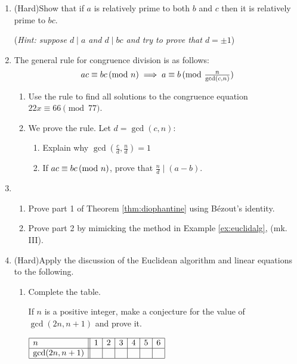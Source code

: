 \begin{exercises}{}{}
\begin{enumerate}
	    
	    \item (Hard)\lstsp Show that if $a$ is relatively prime to both $b$ and $c$ then it is relatively prime to $bc$.\par
	    (\emph{Hint: suppose $d\mid a$ and $d\mid bc$ and try to prove that $d=\pm 1$})
	    
	    
			\item\label{exs:congdivision} The general rule for congruence division is as follows:
			\[
				ac\equiv bc\negthickspace\pmod{n} \implies a\equiv b\negthickspace\pmod{\tfrac n{\gcd(c,n)}}
			\]
			\begin{enumerate}
			  \item Use the rule to find all solutions to the congruence equation $22x\equiv 66\pmod{77}$.
			  \item We prove the rule. Let $d=\gcd(c,n)$:
			  \begin{enumerate}
			    \item Explain why $\gcd(\frac cd,\frac nd)=1$
			  	\item If $ac\equiv bc\negthickspace\pmod{n}$, prove that $\frac nd\mid(a-b)$.
				\end{enumerate}
			\end{enumerate}
			
	    
	  \item\begin{enumerate}
	    \item Prove part 1 of Theorem \ref{thm:diophantine} using Bézout's identity.
	    \item Prove part 2 by mimicking the method in Example \ref{ex:euclidalg}, (mk.\,III).
	  \end{enumerate} 
	    
	    
	  \item (Hard)\lstsp Apply the discussion of the Euclidean algorithm and linear equations to the following.
	  
	  \begin{enumerate}
	    \item Complete the table.\par
	    \begin{minipage}[t]{0.55\linewidth}\vspace{-8pt}
	  	If $n$ is a positive integer, make a conjecture for the value of $\gcd(2n,n+1)$ and prove it.
	    \end{minipage}
	    \hfill
	    \begin{minipage}[t]{0.43\linewidth}\vspace{-20pt}
	    \flushright
	    $\begin{array}{|l||c|c|c|c|c|c|}
	  			\hline
	  			n&1&2&3&4&5&6\\\hline
	  			\gcd(2n,n+1)&&&&&&\\\hline
	  		\end{array}$
	    \end{minipage}
	

\end{enumerate}
\end{enumerate}
\end{exercises}
